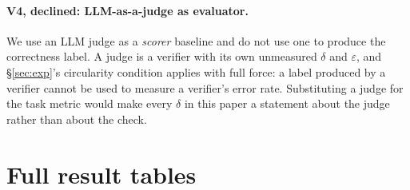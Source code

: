 \documentclass[11pt]{article}
\begin{document}
\paragraph{V4, declined: LLM-as-a-judge as evaluator.} We use an LLM judge as a
\emph{scorer} baseline and do not use one to produce the correctness label. A
judge is a verifier with its own unmeasured $\delta$ and $\varepsilon$, and
\S\ref{sec:exp}'s circularity condition applies with full force: a label produced
by a verifier cannot be used to measure a verifier's error rate. Substituting a
judge for the task metric would make every $\delta$ in this paper a statement
about the judge rather than about the check.

\section{Full result tables}\label{app:fulltables}
\end{document}
